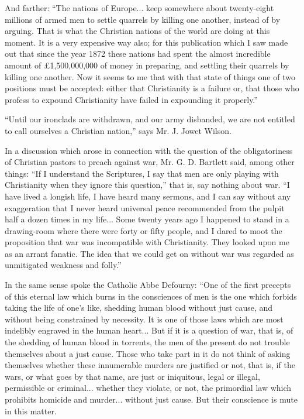\documentclass{book}
\begin{document}
And farther: “The nations of Europe... keep somewhere about twenty-eight millions of armed men to settle quarrels by killing one another, instead of by arguing. That is what the Christian nations of the world are doing at this moment. It is a very expensive way also; for this publication which I saw made out that since the year 1872 these nations had spent the almost incredible amount of £1,500,000,000 of money in preparing, and settling their quarrels by killing one another. Now it seems to me that with that state of things one of two positions must be accepted: either that Christianity is a failure or, that those who profess to expound Christianity have failed in expounding it properly.”

“Until our ironclads are withdrawn, and our army disbanded, we are not entitled to call ourselves a Christian nation,” says Mr. J. Jowet Wilson.

In a discussion which arose in connection with the question of the obligatoriness of Christian pastors to preach against war, Mr. G. D. Bartlett said, among other things: “If I understand the Scriptures, I say that men are only playing with Christianity when they ignore this question,” that is, say nothing about war. “I have lived a longish life, I have heard many sermons, and I can say without any exaggeration that I never heard universal peace recommended from the pulpit half a dozen times in my life... Some twenty years ago I happened to stand in a drawing-room where there were forty or fifty people, and I dared to moot the proposition that war was incompatible with Christianity. They looked upon me as an arrant fanatic. The idea that we could get on without war was regarded as unmitigated weakness and folly.”

In the same sense spoke the Catholic Abbe Defourny: “One of the first precepts of this eternal law which burns in the consciences of men is the one which forbids taking the life of one’s like, shedding human blood without just cause, and without being constrained by necessity. It is one of those laws which are most indelibly engraved in the human heart... But if it is a question of war, that is, of the shedding of human blood in torrents, the men of the present do not trouble themselves about a just cause. Those who take part in it do not think of asking themselves whether these innumerable murders are justified or not, that is, if the wars, or what goes by that name, are just or iniquitous, legal or illegal, permissible or criminal... whether they violate, or not, the primordial law which prohibits homicide and murder... without just cause. But their conscience is mute in this matter.
\end{document}
